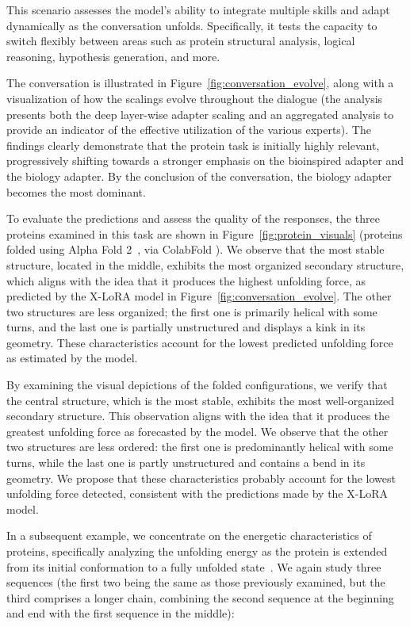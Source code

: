 This scenario assesses the model’s ability to integrate multiple skills and adapt dynamically as the conversation unfolds. Specifically, it tests the capacity to switch flexibly between areas such as protein structural analysis, logical reasoning, hypothesis generation, and more.

The conversation is illustrated in Figure~\ref{fig:conversation_evolve}, along with a visualization of how the scalings evolve throughout the dialogue (the analysis presents both the deep layer-wise adapter scaling and an aggregated analysis to provide an indicator of the effective utilization of the various experts). The findings clearly demonstrate that the protein task is initially highly relevant, progressively shifting towards a stronger emphasis on the bioinspired adapter and the biology adapter. By the conclusion of the conversation, the biology adapter becomes the most dominant.

To evaluate the predictions and assess the quality of the responses, the three proteins examined in this task are shown in Figure~\ref{fig:protein_visuals} (proteins folded using Alpha Fold 2~\cite{Jumper2021HighlyAlphaFoldb}, via ColabFold \cite{Mirdita2022ColabFold:All}). We observe that the most stable structure, located in the middle, exhibits the most organized secondary structure, which aligns with the idea that it produces the highest unfolding force, as predicted by the X-LoRA model in Figure~\ref{fig:conversation_evolve}. The other two structures are less organized; the first one is primarily helical with some turns, and the last one is partially unstructured and displays a kink in its geometry. These characteristics account for the lowest predicted unfolding force as estimated by the model.

By examining the visual depictions of the folded configurations, we verify that the central structure, which is the most stable, exhibits the most well-organized secondary structure. This observation aligns with the idea that it produces the greatest unfolding force as forecasted by the model. We observe that the other two structures are less ordered: the first one is predominantly helical with some turns, while the last one is partly unstructured and contains a bend in its geometry. We propose that these characteristics probably account for the lowest unfolding force detected, consistent with the predictions made by the X-LoRA model.

In a subsequent example, we concentrate on the energetic characteristics of proteins, specifically analyzing the unfolding energy as the protein is extended from its initial conformation to a fully unfolded state~\cite{Ni2023ForceGen:Model}. We again study three sequences (the first two being the same as those previously examined, but the third comprises a longer chain, combining the second sequence at the beginning and end with the first sequence in the middle):

